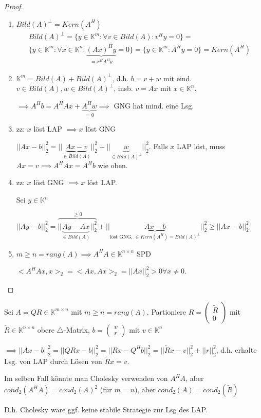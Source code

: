 \begin{proof}
	\begin{enumerate}
		\item $Bild(A)^\perp = Kern(A^H)$
		\begin{align*}
			Bild(A)^\perp = \{y \in \mathbb{K}^m: \forall v \in Bild(A) : v^Hy = 0\} =\\
			\{y \in \mathbb{K}^m: \forall x \in \mathbb{K}^n: \underbrace{(Ax)^Hy}_{=x^HA^Hy} = 0\} =
			\{y \in \mathbb{K}^m: A^Hy = 0\} = 
			Kern(A^H)
		\end{align*}
		
		\item $\mathbb{K}^m = Bild(A) + Bild(A)^\perp$, d.h. $b=v+w$ mit eind. $v \in Bild(A), w \in Bild(A)^\perp$, insb. $v=Ax$ mit $x \in \mathbb{K}^n$.
		
		$\implies A^Hb = A^HAx + \underbrace{A^Hw}_{=0} \implies$ GNG hat mind. eine Lsg.
		
		\item zz: $x$ löst LAP $\implies x$ löst GNG
		
		$||Ax-b||_2^2 = ||\underbrace{Ax - v}_{\in Bild(A)}||_2^2 + ||\underbrace{w}_{\in Bild(A)^\perp}||_2^2$. Falls $x$ LAP löst, muss $Ax=v \implies A^HAx = A^Hb$ wie oben.
		
		\item zz: $x$ löst GNG $\implies x$ löst LAP.
		
		Sei $y \in \mathbb{K}^n$
		
		$||Ay - b||_2^2 = \overbrace{||\underbrace{Ay - Ax}_{\in Bild(A)}||_2^2}^{\geq 0} + ||\underbrace{Ax - b}_{\text{löst GNG, } \in Kern(A^H) = Bild(A)^\perp}||_2^2 \geq ||Ax - b||_2^2$
		
		\item $m \geq n = rang(A) \implies A^HA \in \mathbb{K}^{n\times n}$ SPD
		
		$<A^HAx, x>_2 = <Ax,Ax>_2 = ||Ax||_2^2 > 0 \forall x \neq 0$.
	\end{enumerate}
\end{proof}

\begin{remark}
	Sei $A = QR \in \mathbb{K}^{m\times n}$ mit $m \geq n = rang(A)$. Partioniere $R = \left(\begin{matrix}
		\tilde{R}\\ 0
	\end{matrix}\right)$ mit $\tilde{R} \in \mathbb{K}^{n\times n}$ obere $\triangle$-Matrix, $b = \left(\begin{matrix}
		v\\ r
	\end{matrix}\right)$ mit $v \in \mathbb{K}^n$
	
	$\implies ||Ax-b||_2^2 = ||QR x - b||_2^2 = ||Rx - Q^Hb||_2^2  =||\tilde{R}x - v||_2^2 + ||r||_2^2$, d.h. erhalte Lsg. von LAP durch Lösen von $\tilde{R}x = v$.
\end{remark}

\begin{remark}
	Im selben Fall könnte man Cholesky verwenden von $A^HA$, aber $cond_2(A^HA) = cond_2(A)^2$ (für $m=n$), aber $cond_2(A) = cond_2(\tilde{R})$
	
	D.h. Cholesky wäre ggf. keine stabile Strategie zur Lsg des LAP.
\end{remark}

